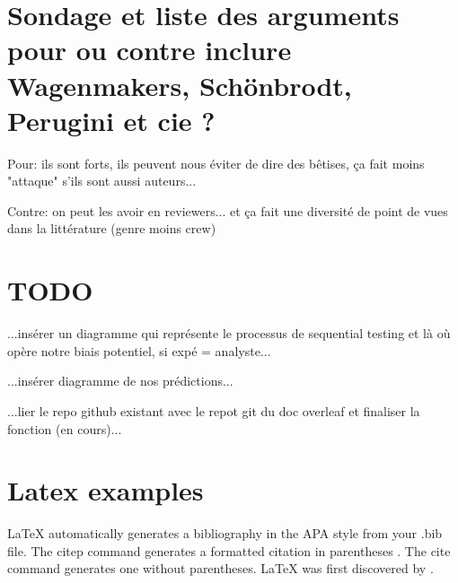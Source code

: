 \documentclass[a4paper,man,natbib]{apa6}
\begin{document}
\section{Sondage et liste des arguments pour ou contre inclure Wagenmakers, Schönbrodt, Perugini et cie ?}

Pour: ils sont forts, ils peuvent nous éviter de dire des bêtises, ça fait moins "attaque" s'ils sont aussi auteurs...	

Contre: on peut les avoir en reviewers... et ça fait une diversité de point de vues dans la littérature (genre moins crew)

\section{TODO}

...insérer un diagramme qui représente le processus de sequential testing et là où opère notre biais potentiel, si expé = analyste...

...insérer diagramme de nos prédictions...

...lier le repo github existant avec le repot git du doc overleaf et finaliser la fonction (en cours)...

\section{Latex examples}

LaTeX automatically generates a bibliography in the APA style from your .bib file. The citep command generates a formatted citation in parentheses \citep{Lamport1986}. The cite command generates one without parentheses. LaTeX was first discovered by \cite{Lamport1986}.



\end{document}
